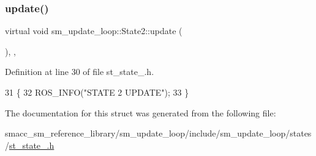 \subsubsection{\texorpdfstring{update()}{update()}}
{\footnotesize\ttfamily virtual void sm\+\_\+update\+\_\+loop\+::\+State2\+::update (\begin{DoxyParamCaption}{ }\end{DoxyParamCaption})\hspace{0.3cm}{\ttfamily [inline]}, {\ttfamily [override]}, {\ttfamily [virtual]}}



Definition at line 30 of file st\+\_\+state\+\_.\+h.


\begin{DoxyCode}
31     \{
32         ROS\_INFO(\textcolor{stringliteral}{"STATE 2 UPDATE"});
33     \}
\end{DoxyCode}


The documentation for this struct was generated from the following file\+:\begin{DoxyCompactItemize}
\item 
smacc\+\_\+sm\+\_\+reference\+\_\+library/sm\+\_\+update\+\_\+loop/include/sm\+\_\+update\+\_\+loop/states/\hyperlink{sm__update__loop_2include_2sm__update__loop_2states_2st__state__2_8h}{st\+\_\+state\+\_.\+h}\end{DoxyCompactItemize}
